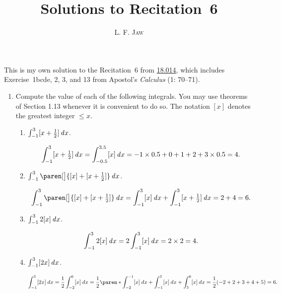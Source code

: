 \documentclass[a4paper]{article}
\title{Solutions to Recitation~6}
\author{L. F. \textsc{Jaw}}
\begin{document}
\maketitle

This is my own solution to the Recitation~6 from
\href{https://ocw.mit.edu/courses/mathematics/18-014-calculus-with-theory-fall-2010/recitations/}{18.014},
which includes Exercise~1bcde, 2, 3, and 13 from Apostol's
\textit{Calculus} (1: 70--71).

\begin{enumerate}
\item Compute the value of each of the following integrals.  You may use
  theorems of Section 1.13 whenever it is convenient to do so.  The
  notation \([x]\) denotes the greatest integer \(\le x\).
  \begin{enumerate}
    \everymath{\displaystyle}
  \item \(\int_{-1}^3 [x + \tfrac12] \mathop{}\!\mathit{d} x\).

    \begin{displaymath}
      \int_{-1}^3 [x + \tfrac12] \mathop{}\!\mathit{d} x
      = \int_{-0.5}^{3.5} [x] \mathop{}\!\mathit{d} x
      = -1 \times 0.5 + 0 + 1 + 2 + 3 \times 0.5
      = 4.
    \end{displaymath}

  \item \(\int_{-1}^3 \paren[\big]{[x] + [x + \tfrac12]} \dx\).

    \begin{displaymath}
      \int_{-1}^3 \paren[\big]{[x] + [x + \tfrac12]} \dx
        = \int_{-1}^3 [x] \dx + \int_{-1}^3 [x + \tfrac12] \dx
        = 2 + 4 = 6.
    \end{displaymath}

  \item \(\int_{-1}^3 2[x] \mathop{}\!\mathit{d} x\).

    \begin{displaymath}
      \int_{-1}^3 2[x] \mathop{}\!\mathit{d} x = 2 \int_{-1}^3 [x] \mathop{}\!\mathit{d} x = 2 \times 2 = 4.
    \end{displaymath}

  \item \(\int_{-1}^3 [2x] \mathop{}\!\mathit{d} x\).

    \begin{displaymath}
      \int_{-1}^3 [2x] \dx
        = \frac12 \int_{-2}^6 [x] \dx
        = \frac12 \paren*{\int_{-2}^{-1} [x] \dx + \int_{-1}^3 [x] \dx
          + \int_3^6 [x] \dx}
        = \frac12 (-2 + 2 + 3 + 4 + 5)
        = 6.
    \end{displaymath}
  \end{enumerate}


\end{enumerate}
\end{document}
